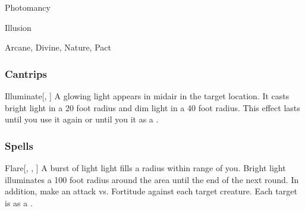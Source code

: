 \newpage
\begin{spellsection}{Photomancy}

\begin{spellheader}
\end{spellheader}


 Illusion

 Arcane, Divine, Nature, Pact

\subsubsection{Cantrips}


\begin{freeability}{Illuminate}[, ]
A glowing light appears in midair in the target location.
It casts bright light in a 20 foot radius and dim light in a 40 foot radius.
This effect lasts until you use it again or until you  it as a .
\end{freeability}

\end{spellsection}


\subsubsection{Spells}


\lowercase{\hypertarget{spell:Flare}{}}\label{spell:Flare}
\begin{freeability}[\nth{1}]{\hypertarget{spell:Flare}{Flare}}[, , ]
A burst of light light fills a \areasmall radius  within \rngmed range of you.
Bright light illuminates a 100 foot radius around the area until the end of the next round.
In addition, make an attack vs. Fortitude against each target creature.
\hit Each target is \dazzled as a .
\end{freeability}
\vspace{0.25em}



